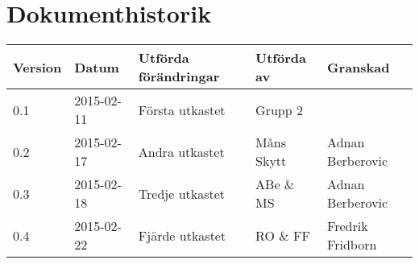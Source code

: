 \documentclass[11pt]{article}
\begin{document}
\section*{Dokumenthistorik}
\begin{table}[h]
\begin{tabular}{|l|l|l|l|l|} \hline

Version & 
Datum & 
Utförda förändringar & 
Utförda av & 
Granskad \\[0.1in] \hline
0.1 &
2015-02-11 & 
Första utkastet & 
Grupp 2 & 
\\ \hline

0.2 &
2015-02-17 & 
Andra utkastet & 
Måns Skytt & 
Adnan Berberovic\\ \hline

0.3 &
2015-02-18 &
Tredje utkastet &
ABe \& MS &
Adnan Berberovic \\ \hline

0.4 &
2015-02-22 &
Fjärde utkastet &
RO \& FF &
Fredrik Fridborn \\ \hline

\end{tabular}
\end{table}


\pagebreak

\end{document}
